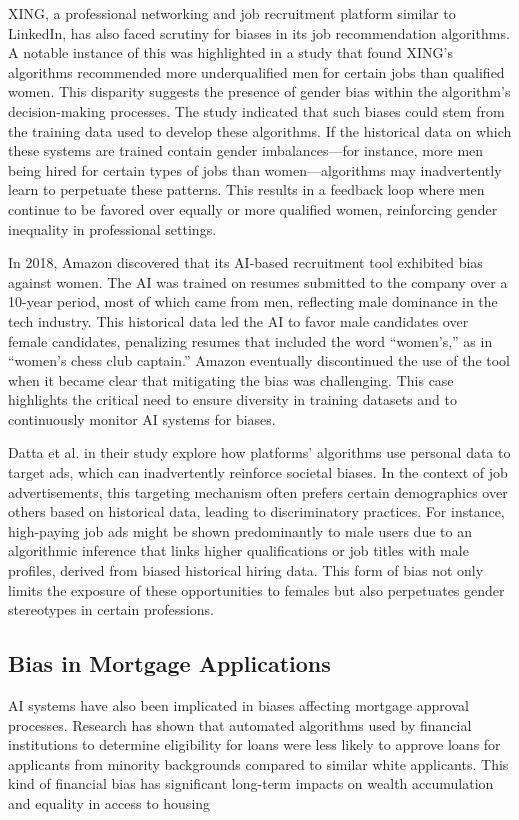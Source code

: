 XING, a professional networking and job recruitment platform similar to LinkedIn, has also faced scrutiny for biases in its job recommendation algorithms. A notable instance of this was highlighted in a study that found XING's algorithms recommended more underqualified men for certain jobs than qualified women. This disparity suggests the presence of gender bias within the algorithm's decision-making processes. The study indicated that such biases could stem from the training data used to develop these algorithms. If the historical data on which these systems are trained contain gender imbalances—for instance, more men being hired for certain types of jobs than women—algorithms may inadvertently learn to perpetuate these patterns. This results in a feedback loop where men continue to be favored over equally or more qualified women, reinforcing gender inequality in professional settings.\cite{Lahoti_Gummadi_Weikum_2019}

In 2018, Amazon discovered that its AI-based recruitment tool exhibited bias against women. The AI was trained on resumes submitted to the company over a 10-year period, most of which came from men, reflecting male dominance in the tech industry. This historical data led the AI to favor male candidates over female candidates, penalizing resumes that included the word “women’s,” as in “women’s chess club captain.” Amazon eventually discontinued the use of the tool when it became clear that mitigating the bias was challenging. This case highlights the critical need to ensure diversity in training datasets and to continuously monitor AI systems for biases.\cite{Dastin_2018}

Datta et al. \cite{datta_automated_2015} in their study explore how platforms' algorithms use personal data to target ads, which can inadvertently reinforce societal biases. In the context of job advertisements, this targeting mechanism often prefers certain demographics over others based on historical data, leading to discriminatory practices. For instance, high-paying job ads might be shown predominantly to male users due to an algorithmic inference that links higher qualifications or job titles with male profiles, derived from biased historical hiring data. This form of bias not only limits the exposure of these opportunities to females but also perpetuates gender stereotypes in certain professions.

\subsection{Bias in Mortgage Applications}
AI systems have also been implicated in biases affecting mortgage approval processes. Research has shown that automated algorithms used by financial institutions to determine eligibility for loans were less likely to approve loans for applicants from minority backgrounds compared to similar white applicants. This kind of financial bias has significant long-term impacts on wealth accumulation and equality in access to housing \cite{Bartlett_Morse_Stanton_Wallace_2022}

